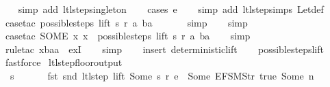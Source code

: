 \begin{isabellebody}
\ {}\ \isamarkupfalse%
\ {\isacharparenleft}simp\ add{\isacharcolon}\ ltl{\isacharunderscore}step{\isacharunderscore}singleton{\isacharparenright}\isanewline
\ \ \isamarkupfalse%
\ {\isacharparenleft}cases\ e{\isacharparenright}\isanewline
\ \ \isamarkupfalse%
\ {\isacharparenleft}simp\ add{\isacharcolon}\ ltl{\isacharunderscore}step{\isachardot}simps\ Let{\isacharunderscore}def{\isacharparenright}\isanewline
\ \ \isamarkupfalse%
\ {\isacharparenleft}case{\isacharunderscore}tac\ {\isachardoublequoteopen}possible{\isacharunderscore}steps\ lift\ s\ r\ a\ ba\ {\isacharequal}\ {\isacharbraceleft}{\isacharbar}{\isacharbar}{\isacharbraceright}{\isachardoublequoteclose}{\isacharparenright}\isanewline
\ \ \ \isamarkupfalse%
\ simp\isanewline
\ \ \isamarkupfalse%
\ simp\isanewline
\ \ \isamarkupfalse%
\ {\isacharparenleft}case{\isacharunderscore}tac\ {\isachardoublequoteopen}SOME\ x{\isachardot}\ x\ {\isacharbar}{\isasymin}{\isacharbar}\ possible{\isacharunderscore}steps\ lift\ s\ r\ a\ ba{\isachardoublequoteclose}{\isacharparenright}\isanewline
\ \ \isamarkupfalse%
\ simp\isanewline
\ \ \isamarkupfalse%
\ {\isacharparenleft}rule{\isacharunderscore}tac\ x{\isacharequal}baa\ \ exI{\isacharparenright}\isanewline
\ \ \isamarkupfalse%
\ simp\isanewline
\ \ \isamarkupfalse%
\ {\isacharparenleft}insert\ deterministic{\isacharunderscore}lift{\isacharparenright}\isanewline
\ \ \isamarkupfalse%
\ possible{\isacharunderscore}steps{\isacharunderscore}lift\ \isamarkupfalse%
\ fastforce%
\endisatagproof
{\isafoldproof}%
%
\isadelimproof
\isanewline
%
\endisadelimproof
\isanewline
{}\isamarkupfalse%
\ ltl{\isacharunderscore}step{\isacharunderscore}floor{\isacharunderscore}output{\isacharcolon}\isanewline
\ \ {\isachardoublequoteopen}s\ {\isasymin}\ {\isacharbraceleft}{}{\isacharcomma}\ {}{\isacharcomma}\ {}{\isacharcomma}\ {}{\isacharbraceright}\ {\isasymLongrightarrow}\ fst\ {\isacharparenleft}snd\ {\isacharparenleft}ltl{\isacharunderscore}step\ lift\ {\isacharparenleft}Some\ s{\isacharparenright}\ r\ e{\isacharparenright}{\isacharparenright}\ {\isasymnoteq}\ {\isacharbrackleft}Some\ {\isacharparenleft}EFSM{\isachardot}Str\ {\isacharprime}{\isacharprime}true{\isacharprime}{\isacharprime}{\isacharparenright}{\isacharcomma}\ Some\ n{\isacharbrackright}{\isachardoublequoteclose}\isanewline

\end{isabellebody}
